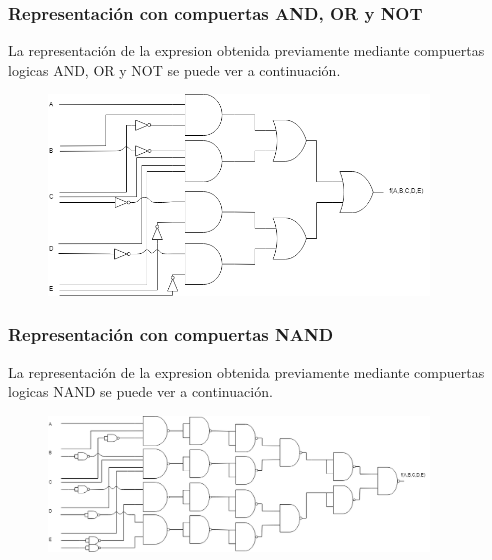 \subsubsection{Representaci\'on con compuertas AND, OR y NOT}
\noindent
La representaci\'on de la expresion obtenida previamente mediante compuertas logicas AND, OR y NOT se puede ver a continuaci\'on.
\newpage
\begin{figure}[h!]
    \centering
    \begin{minipage}{0.85\textwidth}
        \centering
        \includegraphics[width=0.9\textwidth]{images/ej2/ej2andornot .png} %
         \label{fig:ej2andornot}
    \end{minipage}\hfill
\end{figure}

\subsubsection{Representaci\'on con compuertas NAND}
\noindent
La representaci\'on de la expresion obtenida previamente mediante compuertas logicas NAND se puede ver a continuaci\'on.

\begin{figure}[h!]
    \centering
    \begin{minipage}{0.85\textwidth}
        \centering
        \includegraphics[width=0.9\textwidth]{images/ej2/ej2nand.png} %
         \label{fig:ej2nand}
    \end{minipage}\hfill
\end{figure}